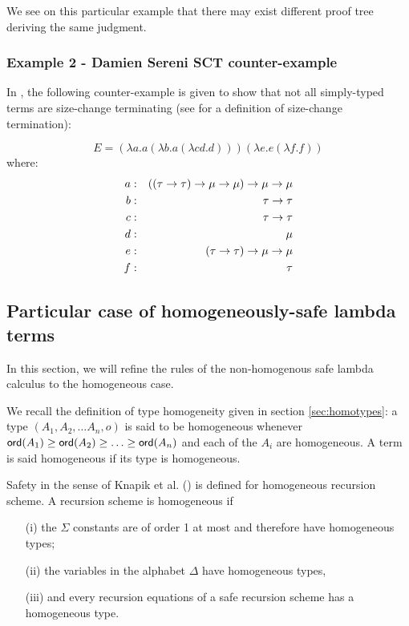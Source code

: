 We see on this particular example that there may exist different proof tree
deriving the same judgment.

\subsubsection{Example 2 - Damien Sereni SCT counter-example}
In \cite{serenistypesct05}, the following counter-example is given
to show that not all simply-typed terms are size-change terminating
(see \cite{jones01} for a definition of size-change termination):

$$ E =  (\lambda a . a (\lambda b . a (\lambda c d .d))) (\lambda e . e (\lambda f .f))$$
where:
\begin{eqnarray*}
a &:& ((\tau \rightarrow \tau) \rightarrow \mu \rightarrow \mu) \rightarrow \mu \rightarrow \mu \\
b &:& \tau \rightarrow \tau \\
c &:& \tau \rightarrow \tau \\
d &:& \mu \\
e &:& (\tau \rightarrow \tau) \rightarrow \mu \rightarrow \mu \\
f &:& \tau
\end{eqnarray*}


\subsection{Particular case of homogeneously-safe lambda terms}

In this section, we will refine the rules of the non-homogenous safe lambda calculus to the homogeneous case.

We recall the definition of type homogeneity given in section \ref{sec:homotypes}:
a type $(A_1, A_2, \ldots A_n, o)$ is said to be homogeneous whenever ${\sf ord}(A_1) \geq {\sf ord}(A_2) \geq
\ldots \geq  {\sf ord}(A_n)$ and each of the $A_i$ are homogeneous. A term is said homogeneous if its type is homogeneous.

Safety in the sense of Knapik et al. (\cite{KNU02}) is defined for homogeneous recursion scheme.
A recursion scheme is homogeneous if
\begin{itemize}
    \item[(i)] the $\Sigma$ constants are of order 1 at most and therefore have homogeneous types;
    \item[(ii)] the variables in the alphabet $\Delta$ have homogeneous types,
    \item[(iii)] and every recursion equations of a safe recursion scheme has a homogeneous type.
\end{itemize}

